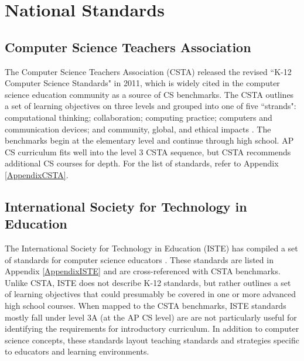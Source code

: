 \section{National Standards}

\subsection{Computer Science Teachers Association}
The Computer Science Teachers Association (CSTA) released the revised ``K-12 Computer Science Standards" in 2011, which is widely cited in the computer science education community as a source of CS benchmarks. The CSTA outlines a set of learning objectives on three levels and grouped into one of five ``strands": computational thinking; collaboration; computing practice; computers and communication devices; and community, global, and ethical impacts \cite{csta}. The benchmarks begin at the elementary level and continue through high school. AP CS curriculum fits well into the level 3 CSTA sequence, but CSTA recommends additional CS courses for depth. For the list of standards, refer to Appendix \ref{AppendixCSTA}.\par


\subsection{International Society for Technology in Education}
The International Society for Technology in Education (ISTE) has compiled a set of standards for computer science educators \cite{iste}. These standards are listed in Appendix \ref{AppendixISTE} and are cross-referenced with CSTA benchmarks. Unlike CSTA, ISTE does not describe K-12 standards, but rather outlines a set of learning objectives that could presumably be covered in one or more advanced high school courses. When mapped to the CSTA benchmarks, ISTE standards mostly fall under level 3A (at the AP CS level) are are not particularly useful for identifying the requirements for introductory curriculum. In addition to computer science concepts, these standards layout teaching standards and strategies specific to educators and learning environments. \par


